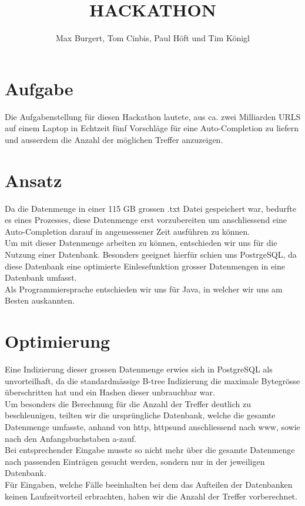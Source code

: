 \documentclass[11pt]{article} %
\title{\textbf{HACKATHON}}
\author{Max Burgert, Tom Cinbis, Paul Höft und Tim Königl}
\begin{document}
\maketitle

\section{Aufgabe}
Die Aufgabenstellung für diesen Hackathon lautete, aus ca. zwei Milliarden URLS auf einem Laptop in Echtzeit fünf Vorschläge für eine Auto-Completion zu liefern und ausserdem die Anzahl der möglichen Treffer anzuzeigen. 

\section{Ansatz}
Da die Datenmenge in einer 115 GB grossen .txt Datei gespeichert war, bedurfte es eines Prozesses, diese Datenmenge erst vorzubereiten um anschliessend eine Auto-Completion darauf in angemessener Zeit ausführen zu können.\\
Um mit dieser Datenmenge arbeiten zu können, entschieden wir uns für die Nutzung einer Datenbank. Besonders geeignet hierfür schien uns PostrgeSQL, da diese Datenbank eine optimierte Einlesefunktion grosser Datenmengen in eine Datenbank umfasst.\\
Als Programmiersprache entschieden wir uns für Java, in welcher wir uns am Besten auskannten.

\section{Optimierung}
Eine Indizierung dieser grossen Datenmenge erwies sich in PostgreSQL als unvorteilhaft, da die standardmässige B-tree Indizierung die maximale Bytegrösse überschritten hat und ein Hashen dieser unbrauchbar war.\\
Um besonders die Berechnung für die Anzahl der Treffer deutlich zu beschleunigen, teilten wir die ursprüngliche Datenbank, welche die gesamte Datenmenge umfasste, anhand von \glqq http\grqq, \glqq https\grqq und anschliessend nach \glqq www\grqq, sowie nach den Anfangsbuchstaben \glqq a-z\grqq  auf.\\
Bei entsprechender Eingabe musste so nicht mehr über die gesamte Datenmenge nach passenden Einträgen gesucht werden, sondern nur in der jeweiligen Datenbank.\\
Für Eingaben, welche Fälle beeinhalten bei dem das Aufteilen der Datenbanken keinen Laufzeitvorteil erbrachten, haben wir die Anzahl der Treffer vorberechnet.
\end{document}
